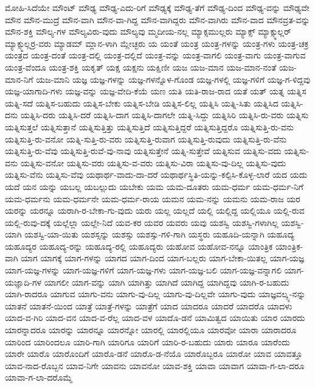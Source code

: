 {ಮೋಹಿ-ಸಿದೆಯೇ
ಮೌಂಟ್
ಮೌಢ್ಯ
ಮೌಢ್ಯ-ಎದು-ರಿಗೆ
ಮೌಢ್ಯಕ್ಕೆ
ಮೌಢ್ಯ-ತೆಗೆ
ಮೌಢ್ಯ-ದಿಂದ
ಮೌಢ್ಯ-ವನ್ನು
ಮೌಢ್ಯವೇ
ಮೌನ
ಮೌನ-ಮುದ್ರೆ
ಮೌನ-ವಾಗಿ
ಮೌನ-ವಾ-ಗಿದ್ದ
ಮೌನ-ವಾಗಿದ್ದರು
ಮೌನ-ವಾಗಿರು
ಮೌನ-ವಾದ
ಮೌನವ್ರತ-ವನ್ನು
ಮೌನ-ಶಕ್ತಿ
ಮೌಲ್ಯ-ಗಳ
ಮೌಲ್ಯವಿರು-ವುದು
ಮೌಲ್ಯವು
ಮ್ಮದೀಯ-ನಲ್ಲ
ಮ್ಯಾಕ್ಸಮುಲ್ಲರು
ಮ್ಯಾಕ್ಸ್
ಮ್ಯಾಕ್ಸ್ಮುಲ್ಲರ್
ಮ್ಯಾಕ್ಸ್ಮುಲ್ಲರ್ರ-ವರು
ಮ್ಯಾಡಮ್
ಮ್ಲಾನ-ಳಾಗಿ
ಮ್ಲೇಚ್ಛರು
ಯ
ಯಂತೆ
ಯಂತ್ರ
ಯಂತ್ರ-ಗಳನ್ನು
ಯಂತ್ರ-ಗಳು
ಯಂತ್ರ-ಚಕ್ರ
ಯಂತ್ರದ
ಯಂತ್ರ-ದಂತೆ
ಯಂತ್ರ-ದಲ್ಲಿ
ಯಂತ್ರ-ದಲ್ಲಿದೆ
ಯಂತ್ರ-ವನ್ನು
ಯಂತ್ರ-ವಾಗಲಿ
ಯಂತ್ರ-ವಾಗು
ಯಂತ್ರ-ವಾಗುವ
ಯಂತ್ರ-ವೆಂದೂ
ಯಂತ್ರ-ಶಕ್ತಿ
ಯಕೃತ್
ಯಕ್ಷ
ಯಕ್ಷನು
ಯಕ್ಷಿಣೀ
ಯಜ
ಯಜ-ಮಾನ
ಯಜ-ಮಾನ-ನಂತೆ
ಯಜ-ಮಾನ-ನಿಗೆ
ಯಜ-ಮಾನಿ
ಯಜ್ಞ
ಯಜ್ಞ-ಗಳನ್ನು
ಯಜ್ಞ-ಗಳನ್ನೊಳ-ಗೊಂಡ
ಯಜ್ಞ-ಗಳಲ್ಲಿ
ಯಜ್ಞ-ಗಳಿಗೆ
ಯಜ್ಞ-ಗ-ಳಿದ್ದವು
ಯಜ್ಞ-ಯಾಗಾದಿ-ಗಳು
ಯಜ್ಞ-ವನ್ನು
ಯಜ್ಞ-ವೇದಿ-ಕೆಯೆ
ಯಣ
ಯತಿ
ಯತಿ-ರಾಜ-ರಾದ
ಯತೆ
ಯತ್
ಯತ್ನ
ಯತ್ನಿಸ
ಯತ್ನಿ-ಸದೆ
ಯತ್ನಿಸ-ಬಹುದು
ಯತ್ನಿಸ-ಬೇಕು
ಯತ್ನಿಸ-ಬೇಡಿ
ಯತ್ನಿಸ-ಲಿಲ್ಲ
ಯತ್ನಿಸಿ
ಯತ್ನಿ-ಸಿತು
ಯತ್ನಿಸಿದ
ಯತ್ನಿಸಿ-ದನು
ಯತ್ನಿಸಿ-ದರು
ಯತ್ನಿಸಿ-ದರೆ
ಯತ್ನಿಸಿ-ದಾಗ
ಯತ್ನಿಸಿ-ದಾಗಲೇ
ಯತ್ನಿ-ಸಿದ್ದು
ಯತ್ನಿಸಿರಿ
ಯತ್ನಿಸಿ-ರು-ವರು
ಯತ್ನಿಸು
ಯತ್ನಿಸುತ್ತಲೆ
ಯತ್ನಿಸುತ್ತಾನೆ
ಯತ್ನಿಸುತ್ತಿತ್ತು
ಯತ್ನಿಸುತ್ತಿದೆ
ಯತ್ನಿಸುತ್ತಿದ್ದರೆ
ಯತ್ನಿಸುತ್ತಿದ್ದರೊ
ಯತ್ನಿಸುತ್ತಿ-ರು-ವನು
ಯತ್ನಿಸುತ್ತಿ-ರು-ವನೋ
ಯತ್ನಿ-ಸುತ್ತಿ-ರು-ವರು
ಯತ್ನಿಸುತ್ತಿ-ರುವಾಗ
ಯತ್ನಿಸುತ್ತಿ-ರುವುದು
ಯತ್ನಿಸುತ್ತಿ-ರು-ವೆನು
ಯತ್ನಿಸುತ್ತಿ-ರು-ವೆವು
ಯತ್ನಿಸುತ್ತಿ-ರುವೆ-ವು-ನಾವು
ಯತ್ನಿಸುತ್ತೇನೆ
ಯತ್ನಿ-ಸುತ್ತೇವೆ
ಯತ್ನಿಸುವ
ಯತ್ನಿಸು-ವದು
ಯತ್ನಿಸು-ವನು
ಯತ್ನಿಸು-ವನೋ
ಯತ್ನಿಸು-ವರು
ಯತ್ನಿಸು-ವ-ವರು
ಯತ್ನಿಸು-ವಿರಾ
ಯತ್ನಿಸು-ವು-ದಿಲ್ಲ
ಯತ್ನಿಸು-ವುದು
ಯತ್ನಿಸು-ವೆನು
ಯತ್ನಿಸು-ವೆವು
ಯಥಾರ್ಥ-ವಾದು-ದಾ-ದರೆ
ಯಥಾರ್ಥಸ್ಥಿತಿ-ಯನ್ನು-ಕಲ್ಪಿಸಿ-ಕೊಳ್ಳ-ಲಾರೆ
ಯದ
ಯದು
ಯದೆ
ಯನ
ಯನ್ನು
ಯಬಲ್ಲ
ಯಬಲ್ಲುದು
ಯಬೇಕು
ಯಮ
ಯಮ-ದೂತರು
ಯಮ-ಧರ್ಮ
ಯಮ-ಧರ್ಮ-ನಿಗೆ
ಯಮ-ಧರ್ಮನು
ಯಮ-ಧರ್ಮನೇ
ಯಮ-ಧರ್ಮ-ರಾಯ
ಯಮನ
ಯಮ-ನನ್ನು
ಯಮನು
ಯಮ-ರಾಜ
ಯರ
ಯರನ್ನು
ಯರನ್ನೂ
ಯರಾಗಿ-ರ-ಬೇಕಾ-ಗು-ವುದು
ಯರು
ಯಲ್ಲ
ಯಲ್ಲದೆ
ಯಲ್ಲಿ
ಯಲ್ಲಿದ್ದ
ಯಲ್ಲಿಯೂ
ಯಲ್ಲಿ-ರುವ
ಯಲ್ಲಿ-ರುವು-ದಕ್ಕೆ
ಯಲ್ಲೆಲ್ಲಾ
ಯಲ್ಲೇ-ನಿದೆ
ಯವ-ಕರ
ಯವರ
ಯವರು
ಯವು
ಯಶಸ್ವಿ
ಯಶಸ್ವಿ-ಗಳಾಗಿಲ್ಲ
ಯಶಸ್ವಿ-ಯಾಗಿ
ಯಶಸ್ವಿ-ಯಾ-ಯಿತು
ಯಶಸ್ಸನ್ನು
ಯಶಸ್ಸು
ಯಶಸ್ಸು-ಗಳಿ-ಗಾಗಿ
ಯಸ್ಥರು
ಯಹೂದಿ-ಯನ್ನಾಗಿ
ಯಹೂದ್ಯ
ಯಹೂದ್ಯರ
ಯಹೂದ್ಯ-ರನ್ನು
ಯಹೂದ್ಯ-ರಲ್ಲಿ
ಯಹೂದ್ಯರು
ಯಹೋವ
ಯಹೋವ-ನನ್ನೂ
ಯಾಂತ್ರಿಕ
ಯಾಂತ್ರಿಕ-ವಾಗಿ
ಯಾಗ
ಯಾಗಕ್ಕೆ
ಯಾಗ-ಗಳನ್ನು
ಯಾಗದ
ಯಾಗ-ದಿಂದ
ಯಾಗ-ಬಲ್ಲರು
ಯಾಗ-ಬೇಕಾ-ಯಿತಲ್ಲ
ಯಾಗ-ಯಜ್ಞ
ಯಾಗ-ಯಜ್ಞ-ಗಳನ್ನು
ಯಾಗ-ಯಜ್ಞ-ಗಳಿಗೆ
ಯಾಗ-ಯಜ್ಞ-ಗಳು
ಯಾಗ-ಯಜ್ಞ-ಬಲಿ
ಯಾಗ-ಯಜ್ಞ-ವನ್ನಾಗಲಿ
ಯಾಗ-ಯಜ್ಞಾದಿ-ಗಳ
ಯಾಗಲೀ
ಯಾಗ-ವನ್ನು
ಯಾಗಿ
ಯಾಗಿತ್ತು
ಯಾಗಿದೆ
ಯಾಗಿದ್ದ
ಯಾಗಿದ್ದವು
ಯಾಗಿ-ರ-ಬಹುದು
ಯಾಗಿ-ರಾದರೂ
ಯಾಗುವ
ಯಾಗು-ವನು
ಯಾಗು-ವು-ದಿಲ್ಲ
ಯಾಗು-ವು-ದಿಲ್ಲವೇ
ಯಾಗು-ವುದು
ಯಾಜ್ಞವಲ್ಕ್ಯ-ನನ್ನು
ಯಾತನೆ
ಯಾತನೆ-ಯಿಂದ
ಯಾತ್ರೆ
ಯಾತ್ರೆ-ಗಳನ್ನು
ಯಾತ್ರೆಗೆ
ಯಾದ
ಯಾದರೂ
ಯಾದರೆ
ಯಾದರೊ
ಯಾದಳು
ಯಾದ-ವ-ಗಿರಿ
ಯಾದ-ವನ
ಯಾದ-ವ-ರೆಲ್ಲ
ಯಾದ-ವಳ
ಯಾದೊ-ಡನೆ
ಯಾಮಿತ್ವದ
ಯಾಯಿತು
ಯಾರ
ಯಾರದು
ಯಾರನ್ನಾದರೂ
ಯಾರನ್ನು
ಯಾರನ್ನೂ
ಯಾರನ್ನೋ
ಯಾರಲ್ಲಿ
ಯಾರಲ್ಲಿಯೂ
ಯಾರವೋ
ಯಾರಾ
ಯಾರಾದರೂ
ಯಾರಿಂದ
ಯಾರಿಂದಲೂ
ಯಾರಿ-ಗಾಗಿ
ಯಾರಿಗೂ
ಯಾರಿಗೆ
ಯಾರಿ-ರ-ಬಹುದು
ಯಾರು
ಯಾರೂ
ಯಾರೆಂದು
ಯಾರೇ
ಯಾರೊ
ಯಾರೊಂದಿಗೆ
ಯಾರೊ-ಡನೆ
ಯಾರೊ-ಡ-ನೆಯೊ
ಯಾರೊಬ್ಬರೂ
ಯಾರೋ
ಯಾವ
ಯಾವತ್ತೂ
ಯಾವ-ನಾದ-ರೊಬ್ಬನ
ಯಾವ-ನಿಗೇ
ಯಾವನು
ಯಾವನೋ
ಯಾವ-ಶಕ್ತಿ
ಯಾವಾ
ಯಾವಾಗ
ಯಾವಾ-ಗ-ಲಾ-ದರೂ
ಯಾವಾ-ಗ-ಲಾ-ದರೊಮ್ಮೆ
}
